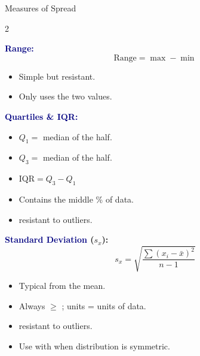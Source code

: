 \documentclass[10pt]{article}
\begin{document}
\vspace{0.08in}

\begin{notesbox}{Measures of Spread}
\small
\begin{multicols}{2}

\textbf{\textcolor{navy}{Range:}}
\[\text{Range} = \max - \min\]
\begin{itemize}[itemsep=3pt]
  \item Simple but  resistant.
  \item Only uses the two  values.
\end{itemize}

\vspace{6pt}
\textbf{\textcolor{navy}{Quartiles \& IQR:}}
\begin{itemize}[itemsep=3pt]
  \item $Q_1 = $ median of the  half.
  \item $Q_3 = $ median of the  half.
  \item $\text{IQR} = Q_3 - Q_1$
  \item Contains the middle \% of data.
  \item {} resistant to outliers.
\end{itemize}

\columnbreak

\textbf{\textcolor{navy}{Standard Deviation} ($s_x$):}
\[s_x = \sqrt{\frac{\sum(x_i - \bar{x})^2}{n-1}}\]
\begin{itemize}[itemsep=3pt]
  \item Typical  from the mean.
  \item Always $\geq$ ; units = units of data.
  \item {} resistant to outliers.
  \item Use with  when distribution is symmetric.
\end{itemize}
\end{multicols}
\end{notesbox}

\vspace{0.08in}
\end{document}
